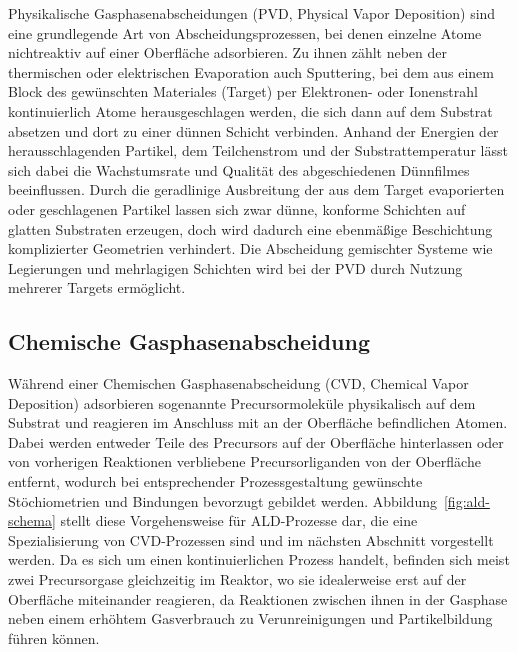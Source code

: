 Physikalische Gasphasenabscheidungen (PVD, Physical Vapor Deposition) sind eine grundlegende Art von Abscheidungsprozessen, bei denen einzelne Atome nichtreaktiv auf einer Oberfläche adsorbieren.
Zu ihnen zählt neben der thermischen oder elektrischen Evaporation auch Sputtering, bei dem aus einem Block des gewünschten Materiales (Target) per Elektronen- oder Ionenstrahl kontinuierlich Atome herausgeschlagen werden, die sich dann auf dem Substrat absetzen und dort zu einer dünnen Schicht verbinden\cite{mattox_handbook_2010,helmersson_ionized_2006}.
Anhand der Energien der herausschlagenden Partikel, dem Teilchenstrom und der Substrattemperatur lässt sich dabei die Wachstumsrate und Qualität des abgeschiedenen Dünnfilmes beeinflussen.
Durch die geradlinige Ausbreitung der aus dem Target evaporierten oder geschlagenen Partikel lassen sich zwar dünne, konforme Schichten auf glatten Substraten erzeugen\cite{svorcik_annealing_2011}, doch wird dadurch eine ebenmäßige Beschichtung komplizierter Geometrien verhindert.
Die Abscheidung gemischter Systeme wie Legierungen und mehrlagigen Schichten wird bei der PVD durch Nutzung mehrerer Targets ermöglicht\cite{cammarata_nanoindentation_1990}.

\subsection{Chemische Gasphasenabscheidung}

Während einer Chemischen Gasphasenabscheidung (CVD, Chemical Vapor Deposition) adsorbieren sogenannte Precursormoleküle physikalisch auf dem Substrat und reagieren im Anschluss mit an der Oberfläche befindlichen Atomen.
Dabei werden entweder Teile des Precursors auf der Oberfläche hinterlassen oder von vorherigen Reaktionen verbliebene Precursorliganden von der Oberfläche entfernt, wodurch bei entsprechender Prozessgestaltung gewünschte Stöchiometrien und Bindungen bevorzugt gebildet werden\cite{pierson_handbook_1999}.
Abbildung~\ref{fig:ald-schema} stellt diese Vorgehensweise für ALD-Prozesse dar, die eine Spezialisierung von CVD-Prozessen sind und im nächsten Abschnitt vorgestellt werden.
Da es sich um einen kontinuierlichen Prozess handelt, befinden sich meist zwei Precursorgase gleichzeitig im Reaktor, wo sie idealerweise erst auf der Oberfläche miteinander reagieren, da Reaktionen zwischen ihnen in der Gasphase neben einem erhöhtem Gasverbrauch zu Verunreinigungen und Partikelbildung führen können.

